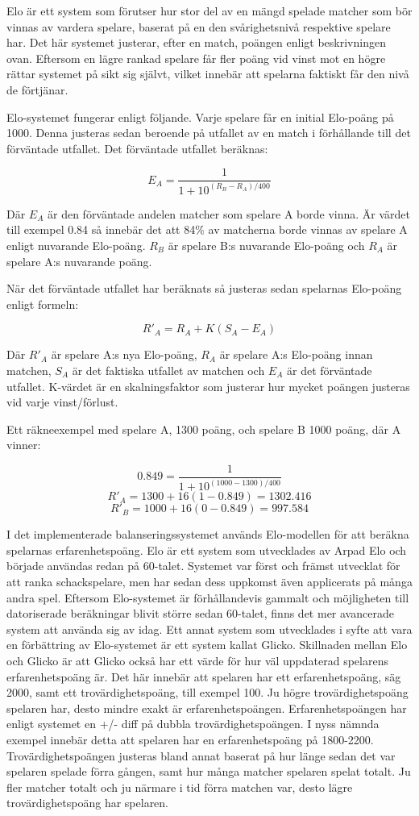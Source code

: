 \documentclass[a4paper, 11pt]{article}
\begin{document}
Elo är ett system som förutser hur stor del av en mängd spelade matcher som bör vinnas av vardera spelare, baserat på en den svårighetsnivå respektive spelare har. Det här systemet justerar, efter en match, poängen enligt beskrivningen ovan. Eftersom en lägre rankad spelare får fler poäng vid vinst mot en högre rättar systemet på sikt sig självt, vilket innebär att spelarna faktiskt får den nivå de förtjänar.

Elo-systemet fungerar enligt följande. Varje spelare får en initial Elo-poäng på 1000. Denna justeras sedan beroende på utfallet av en match i förhållande till det förväntade utfallet. Det förväntade utfallet beräknas:

$$E_A = \frac{1}{1+10^{(R_B-R_A)/400}}$$

Där $E_A$ är den förväntade andelen matcher som spelare A borde vinna. Är värdet till exempel 0.84 så innebär det att 84\% av matcherna borde vinnas av spelare A enligt nuvarande Elo-poäng. $R_B$ är spelare B:s nuvarande Elo-poäng och $R_A$ är spelare A:s nuvarande poäng.

När det förväntade utfallet har beräknats så justeras sedan spelarnas Elo-poäng enligt formeln:

$$R'_A = R_A + K(S_A-E_A)$$

Där $R'_A$ är spelare A:s nya Elo-poäng, $R_A$ är spelare A:s Elo-poäng innan matchen, $S_A$ är det faktiska utfallet av matchen och $E_A$ är det förväntade utfallet. K-värdet är en skalningsfaktor som justerar hur mycket poängen justeras vid varje vinst/förlust.

Ett räkneexempel med spelare A, 1300 poäng, och spelare B 1000 poäng, där A vinner:

$$0.849 = \frac{1}{1+10^{(1000-1300)/400}}$$
$$ R'_A = 1300 + 16(1-0.849) = 1302.416 $$
$$ R'_B = 1000 + 16(0-0.849) = 997.584 $$

I det implementerade balanseringssystemet används Elo-modellen för att beräkna spelarnas erfarenhetspoäng. Elo är ett system som utvecklades av Arpad Elo och började användas redan på 60-talet\cite{elo}. Systemet var först och främst utvecklat för att ranka schackspelare, men har sedan dess uppkomst även applicerats på många andra spel. Eftersom Elo-systemet är förhållandevis gammalt och möjligheten till datoriserade beräkningar blivit större sedan 60-talet, finns det mer avancerade system att använda sig av idag. Ett annat system som utvecklades i syfte att vara en förbättring av Elo-systemet är ett system kallat Glicko\cite{chessratings}. Skillnaden mellan Elo och Glicko är att Glicko också har ett värde för hur väl uppdaterad spelarens erfarenhetspoäng är. Det här innebär att spelaren har ett erfarenhetspoäng, säg 2000, samt ett trovärdighetspoäng, till exempel 100. Ju högre trovärdighetspoäng spelaren har, desto mindre exakt är erfarenhetspoängen. Erfarenhetspoängen har enligt systemet en +/- diff på dubbla trovärdighetspoängen. I nyss nämnda exempel innebär detta att spelaren har en erfarenhetspoäng på 1800-2200. Trovärdighetspoängen justeras bland annat baserat på hur länge sedan det var spelaren spelade förra gången, samt hur många matcher spelaren spelat totalt. Ju fler matcher totalt och ju närmare i tid förra matchen var, desto lägre trovärdighetspoäng har spelaren.
\end{document}
